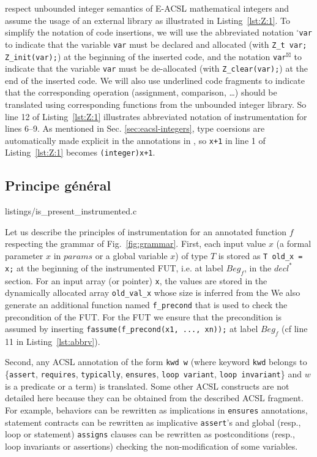 respect unbounded integer semantics of E-ACSL mathematical integers and
assume the usage of an external library as illustrated in Listing~\ref{lst:Z:1}.
To simplify the notation of code insertions, we will use the abbreviated notation
${}^{\square}$\lstinline{var} 
to indicate that the variable \lstinline{var} must be declared and
allocated (with \lstinline{Z_t var; Z_init(var);})
at the beginning of the inserted code, and the notation
\lstinline{var}${}^{\boxtimes}$ 
to indicate that the variable \lstinline{var} must be de-allocated
(with \lstinline{Z_clear(var);})
at the end of the inserted code.
We will also use underlined code fragments to indicate that the corresponding
operation (assignment, comparison, \dots) should be translated using
corresponding functions from the unbounded integer library.
So line 12 of Listing~\ref{lst:Z:1} illustrates abbreviated notation of 
instrumentation for lines 6--9.
As mentioned in Sec. \ref{sec:eacsl-integers}, %
type coersions  
are automatically made explicit in the annotations in \framac, 
so \lstinline'x+1' in line 1 of Listing~\ref{lst:Z:1}  becomes \lstinline'(integer)x+1'.


\subsection{Principe général}




                {listings/is_present_instrumented.c}


Let us describe the principles of instrumentation for an annotated function
$f$ respecting the grammar of Fig.~\ref{fig:grammar}.
First, each input value $x$ (a formal parameter $x$ in $params$ or a global variable $x$) of type
$T$ is stored as \lstinline|T old_x = x;|
at the beginning of the instrumented FUT, i.e. at label $Beg_f$, in
the $decl^*$ section.
For an input array  (or pointer) \lstinline'x', the values are stored in the dynamically
allocated array \lstinline'old_val_x' whose size is inferred from the
We also generate an additional function named \lstinline'f_precond'
that is used to check the precondition of the FUT. For the  FUT  we ensure
that the precondition is assumed by inserting 
\lstinline|fassume(f_precond(x1, ..., xn));| 
at label $Beg_{f}$
(cf line 11 in Listing~\ref{lst:abbrv}).

Second, any \textsc{ACSL} annotation of the form \lstinline|kwd w| (where
keyword \lstinline|kwd| belongs to \{\lstinline|assert|, \lstinline|requires|,
\lstinline|typically|, \lstinline|ensures|, \lstinline|loop variant|,
\lstinline|loop invariant|\} and $w$ is a predicate or a term) is translated.
Some other \textsc{ACSL} constructs are not detailed here because they can be
obtained from the described \textsc{ACSL} fragment. For example, behaviors can
be rewritten as implications in \lstinline|ensures| annotations,
statement contracts can be rewritten as implicative \lstinline|assert|'s and
global (resp., loop or statement)
\lstinline|assigns| clauses can be rewritten as postconditions
(resp., loop invariants or assertions)
checking the non-modification of some variables. 

